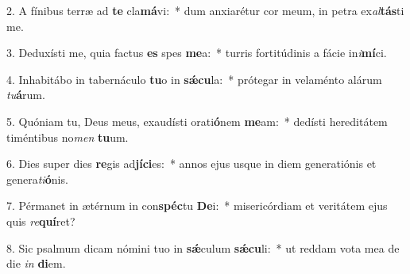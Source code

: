 2. A fínibus terræ ad \textbf{te} cla\textbf{má}vi:~*  dum anxiarétur cor meum, in petra ex\textit{al}\textbf{tás}ti me.\

3. Deduxísti me, quia factus \textbf{es} spes \textbf{me}a:~*  turris fortitúdinis a fácie in\textit{i}\textbf{mí}ci.\

4. Inhabitábo in tabernáculo \textbf{tu}o in \textbf{sǽ}\textbf{cu}la:~*  prótegar in velaménto alárum \textit{tu}\textbf{á}rum.\

5. Quóniam tu, Deus meus, exaudísti orati\textbf{ó}nem \textbf{me}am:~*  dedísti hereditátem timéntibus no\textit{men} \textbf{tu}um.\

6. Dies super dies \textbf{re}gis ad\textbf{jí}\textbf{ci}es:~*  annos ejus usque in diem generatiónis et genera\textit{ti}\textbf{ó}nis.\

7. Pérmanet in ætérnum in con\textbf{spéc}tu \textbf{De}i:~*  misericórdiam et veritátem ejus quis \textit{re}\textbf{quí}ret?\

8. Sic psalmum dicam nómini tuo in \textbf{sǽ}culum \textbf{sǽ}\textbf{cu}li:~*  ut reddam vota mea de die \textit{in} \textbf{di}em.\

